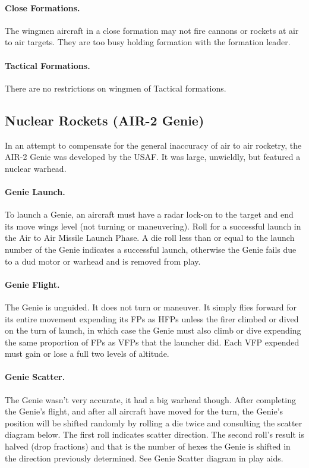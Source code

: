 \paragraph{Close Formations.} The wingmen aircraft in a close formation may not fire cannons or rockets at air to air targets. They are too busy holding formation with the formation leader.

\paragraph{Tactical Formations.} There are no restrictions on wingmen of Tactical formations.

\subsection{Nuclear Rockets (AIR-2 Genie)}


In an attempt to compensate for the general inaccuracy of air to air rocketry, the AIR-2 Genie was developed by the USAF. It was large, unwieldly, but featured a nuclear warhead.

\paragraph{Genie Launch.} To launch a Genie, an aircraft must have a radar lock-on to the target and end its move wings level (not turning or maneuvering). Roll for a successful launch in the Air to Air Missile Launch Phase. A die roll less than or equal to the launch number of the Genie indicates a successful launch, otherwise the Genie fails due to a dud motor or warhead and is removed from play.

\paragraph{Genie Flight.} The Genie is unguided. It does not turn or maneuver. It simply flies forward for its entire movement expending its FPs as HFPs unless the firer climbed or dived on the turn of launch, in which case the Genie must also climb or dive expending the same proportion of FPs as VFPs that the launcher did. Each VFP expended must gain or lose a full two levels of altitude.

\paragraph{Genie Scatter.} The Genie wasn't very accurate, it had a big warhead though. After completing the Genie's flight, and after all aircraft have moved for the turn, the Genie’s position will be shifted randomly by rolling a die twice and consulting the scatter diagram below. The first roll indicates scatter direction. The second roll's result is halved (drop fractions) and that is the number of hexes the Genie is shifted in the direction previously determined. See Genie Scatter diagram in play aids.

